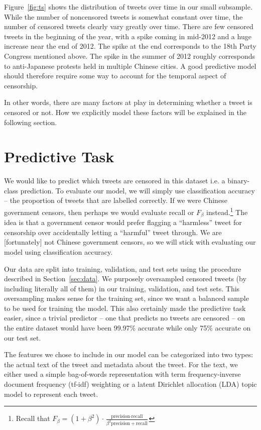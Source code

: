 \documentclass{sig-alternate-05-2015}
\begin{document}
Figure~\ref{fig:ts} shows the distribution of tweets over time in our small subsample. While the number of noncensored tweets is somewhat constant over time, the number of censored tweets clearly vary greatly over time. There are few censored tweets in the beginning of the year, with a spike coming in mid-2012 and a huge increase near the end of 2012. The spike at the end corresponds to the 18th Party Congress mentioned above. The spike in the summer of 2012 roughly corresponds to anti-Japanese protests held in multiple Chinese cities. A good predictive model should therefore require some way to account for the temporal aspect of censorship. 

In other words, there are many factors at play in determining whether a tweet is censored or not. How we explicitly model these factors will be explained in the following section.

\section{Predictive Task} \label{sec:pred}
We would like to predict which tweets are censored in this dataset i.e. a binary-class prediction. To evaluate our model, we will simply use classification accuracy -- the proportion of tweets that are labelled correctly. If we were Chinese government censors, then perhaps we would evaluate recall or $F_\beta$ instead.\footnote{Recall that $F_\beta = (1+\beta^2) \cdot \frac{\text{precision} \cdot \text{recall}}{\beta^2 \text{precision} + \text{recall}}$} The idea is that a government censor would prefer flagging a ``harmless'' tweet for censorship over accidentally letting a ``harmful'' tweet through. We are [fortunately] not Chinese government censors, so we will stick with evaluating our model using classification accuracy. 

Our data are split into training, validation, and test sets using the procedure described in Section~\ref{sec:data}. We purposely oversampled censored tweets (by including literally all of them) in our training, validation, and test sets. This oversampling makes sense for the training set, since we want a balanced sample to be used for training the model. This also certainly made the predictive task easier, since a trivial predictor -- one that predicts no tweets are censored -- on the entire dataset would have been 99.97\% accurate while only 75\% accurate on our test set. 

The features we chose to include in our model can be categorized into two types: the actual text of the tweet and metadata about the tweet. For the text, we either used a simple bag-of-words representation with term frequency-inverse document frequency (tf-idf) weighting or a latent Dirichlet allocation (LDA) topic model to represent each tweet. 
\end{document}
